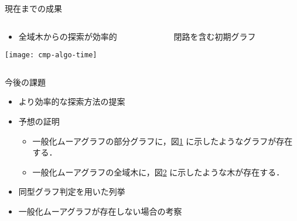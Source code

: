 \begin{frame}{現在までの成果}
  \begin{columns}
    \begin{column}{.6\textwidth}
      \centering
      \begin{itemize}
      \item 全域木からの探索が効率的
      \end{itemize}
      \texttt{[image: cmp-algo-time]}
      \label{fig:result}
    \end{column}
    \begin{column}{.4\textwidth}
      \centering
      \begin{figure}
        \centering
        \def\svgwidth{\textwidth}
        \resizebox{!}{.3\textheight}{
          
        }
        \caption{閉路を含む初期グラフ}
        \label{fig:initial-graph-cycle}
      \end{figure}
      \vspace{-2em}
      \begin{figure}
        \def\svgwidth{\textwidth}
        \resizebox{!}{.3\textheight}{
          
        }
        \label{fig:initial-graph-stree}
      \end{figure}
    \end{column}
  \end{columns}
\end{frame}

\begin{frame}{今後の課題}
  \begin{itemize}
  \item より効率的な探索方法の提案
  \item 予想の証明
    \begin{itemize}
    \item 一般化ムーアグラフの部分グラフに，図\ref{fig:initial-graph-cycle}
      に示したようなグラフが存在する．
    \item 一般化ムーアグラフの全域木に，図\ref{fig:initial-graph-stree}
      に示したような木が存在する．
    \end{itemize}
  \item 同型グラフ判定を用いた列挙
  \item 一般化ムーアグラフが存在しない場合の考察
  \end{itemize}
\end{frame}

